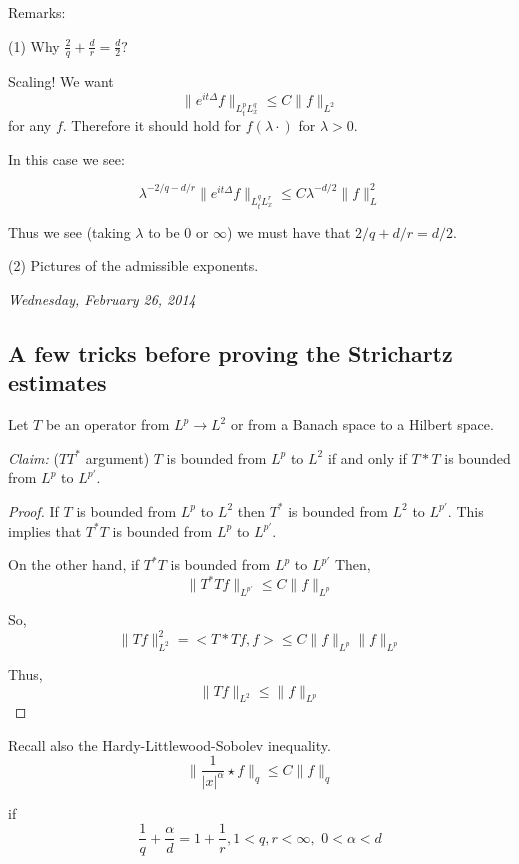 \documentclass[11pt]{amsart}
\theoremstyle{plain}
\numberwithin{equation}{section}
\theoremstyle{remark}
\begin{document}
Remarks: 

(1) Why $\frac{2}{q}+ \frac{d}{r} = \frac{d}{2}?$

Scaling! We want $$\| e^{it\Delta} f \|_{L^p_t L^q_x} \leq C\|f\|_{L^2}$$ for any $f.$ Therefore it should hold for $f(\lambda \cdot)$ for $\lambda>0$.

In this case we see:

$$\lambda^{-2/q-d/r} \| e^{it\Delta}f\|_{L^q_t L^r_x} \leq C\lambda^{-d/2}\|f\|_L^2$$

Thus we see  (taking $\lambda$ to be $0$ or $\infty$) we must have that $2/q+d/r=d/2.$

(2) Pictures of the admissible exponents. 


\emph{Wednesday, February 26, 2014}

\subsection{A few tricks before proving the Strichartz estimates}

Let $T$ be an operator from $L^p \rightarrow L^2$ or from a Banach space to a Hilbert space. 

\emph{Claim:} ($TT^*$ argument) $T$ is bounded from $L^p$ to $L^2$ if and only if $T*T$ is bounded from $L^p$ to $L^{p'}.$

\begin{proof}
If $T$ is bounded from $L^p$ to $L^2$ then $T^*$ is bounded from $L^{2}$ to $L^{p'}.$
This implies that $T^{*}T$ is bounded from $L^p$ to $L^{p'}.$

On the other hand, if $T^{*}T$  is bounded from $L^p$ to $L^{p'}$ Then, $$\| T^* T f\|_{L^{p'}} \leq C \|f \|_{L^p}$$

So, $$\| Tf\|_{L^2}^2 = < T*Tf, f> \leq C \| f \|_{L^{p}} \| f\|_{L^p}$$
 
Thus, $$\| Tf\|_{L^2}\leq \|f \|_{L^p}$$

\end{proof}

Recall also the Hardy-Littlewood-Sobolev inequality. $$\|\frac{1}{|x|^\alpha}\star f \|_q \leq C \|f\|_{q}$$

if $$\frac{1}{q} + \frac{\alpha}{d}= 1+ \frac{1}{r}, 1<q,r<\infty, \, \, 0<\alpha<d$$
\end{document}
